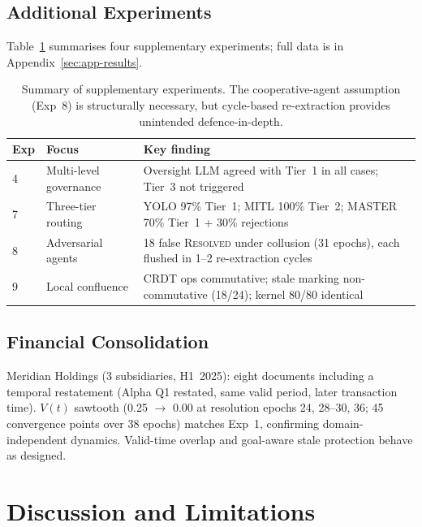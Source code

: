 \documentclass[11pt]{article}
\newcommand{\tsc}[1]{\textnormal{\textsc{#1}}}
\begin{document}
\subsection{Additional Experiments}

Table~\ref{tab:additional-experiments} summarises four supplementary experiments; full data is in Appendix~\ref{sec:app-results}.

\begin{table}[H]
\centering
\small
\begin{tabular}{llp{7.2cm}}
\toprule
\textbf{Exp} & \textbf{Focus} & \textbf{Key finding} \\
\midrule
4 & Multi-level governance & Oversight LLM agreed with Tier~1 in all cases; Tier~3 not triggered \\
7 & Three-tier routing & YOLO 97\% Tier~1; MITL 100\% Tier~2; MASTER 70\% Tier~1 + 30\% rejections \\
8 & Adversarial agents & 18 false \tsc{Resolved} under collusion (31 epochs), each flushed in 1--2 re-extraction cycles \\
9 & Local confluence & CRDT ops commutative; stale marking non-commutative (18/24); kernel 80/80 identical \\
\bottomrule
\end{tabular}
\caption{Summary of supplementary experiments. The cooperative-agent assumption (Exp~8) is structurally necessary, but cycle-based re-extraction provides unintended defence-in-depth.}
\label{tab:additional-experiments}
\end{table}

\subsection{Financial Consolidation}

Meridian Holdings (3 subsidiaries, H1~2025): eight documents including a temporal restatement (Alpha Q1 restated, same valid period, later transaction time).
$V(t)$ sawtooth (0.25 $\to$ 0.00 at resolution epochs 24, 28--30, 36; 45 convergence points over 38 epochs) matches Exp~1, confirming domain-independent dynamics.
Valid-time overlap and goal-aware stale protection behave as designed.

\section{Discussion and Limitations}
\label{sec:discussion}
\end{document}
